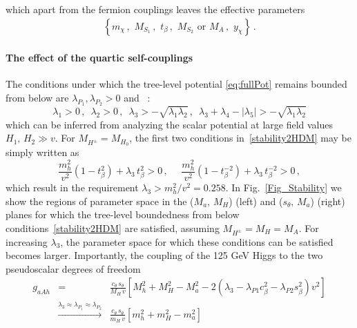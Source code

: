 \newline
%
 which apart from the fermion couplings leaves the effective parameters
 \begin{align}
\left\{m_\chi\,,\,\, M_{S_1}\,,\,\, t_\beta\,,\,\, M_{S_2}\,\, \text{or}  \,\, M_{A}\,, \,\, y_\chi \right\}\,.
\end{align}

\paragraph{The effect of the quartic self-couplings  }

    The conditions under which the tree-level potential \eqref{eq:fullPot} remains bounded from below are $\lambda_{P_1}, \lambda_{P_2}>0$ and ~\cite{Gunion:2002zf}:
    \begin{equation}
    \label{stability2HDM}
     \lambda_1 > 0\,, \,\,\, \lambda_2 > 0\,, \,\,\, \lambda_3 > - \sqrt{\lambda_1 \lambda_2} \,, \,\,\, \lambda_3 + \lambda_4 - |\lambda_5| > - \sqrt{\lambda_1 \lambda_2} 
    \end{equation}
    which can be inferred from analyzing the scalar potential at large field values $H_1,\,H_2 \gg v$. For $M_{H^{\pm}} = M_{H_0}$, the first two conditions 
    in~\eqref{stability2HDM} may be simply written as
    \begin{equation}
     \frac{m_h^2}{v^2} (1-t_{\beta}^{2}) + \lambda_3 \, t_{\beta}^{2} > 0\,, \quad\,\, \frac{m_h^2}{v^2} (1-t_{\beta}^{-2}) + \lambda_3 \, t_{\beta}^{-2} > 0\,,
     \end{equation}
    which result in the requirement $\lambda_3 > m_h^2/v^2 = 0.258$. In Fig.~\ref{Fig_Stability} we show the regions of parameter space in the 
    ($M_a,\, M_{H}$) (left) and ($s_{\theta},\, M_a$) (right) planes for which the tree-level boundedness from below conditions~\eqref{stability2HDM}
    are satisfied, assuming $M_{H^{\pm}} = M_{H} = M_{A}$. For increasing $\lambda_3$, the parameter space for which these conditions can be satisfied becomes larger. Importantly, the coupling of the 125 GeV Higgs to the two pseudoscalar degrees of freedom
        \begin{eqnarray}
     g_{aAh} &=& \frac{c_{\theta} \,s_{\theta}}{M_{H} \,v} \left[M_h^2 + M_H^2 -M_a^2 - 2 
     (\lambda_3 - \lambda_{P1} c_{\beta}^2 - \lambda_{P2} s_{\beta}^2) v^2 \right] \nonumber \\
     &\stackrel{\lambda_3\approx \lambda_{P_1}\approx \lambda_{P_2}}{\longrightarrow}& \frac{c_{\theta} \,s_{\theta}}{m_{H} \,v} \left[m_h^2 + m_H^2 -m_a^2 \right] 
    \end{eqnarray}
